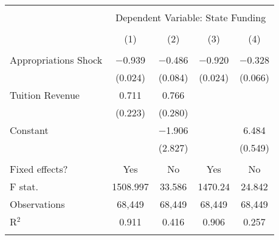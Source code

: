 
\begin{tabular}{@{\extracolsep{5pt}}lcccc} 
\\[-1.8ex]\hline 
\hline \\[-1.8ex] 
 & \multicolumn{4}{c}{Dependent Variable: State Funding} \\ 
\cline{2-5} 
\\[-1.8ex] & (1) & (2) & (3) & (4)\\ 
\hline \\[-1.8ex] 
 Appropriations Shock & $-$0.939 & $-$0.486 & $-$0.920 & $-$0.328 \\ 
  & (0.024) & (0.084) & (0.024) & (0.066) \\ 
  Tuition Revenue & 0.711 & 0.766 &  &  \\ 
  & (0.223) & (0.280) &  &  \\ 
  Constant &  & $-$1.906 &  & 6.484 \\ 
  &  & (2.827) &  & (0.549) \\ 
 \hline \\[-1.8ex] 
Fixed effects? & Yes & No & Yes & No \\ 
F stat. & 1508.997 & 33.586 & 1470.24 & 24.842 \\ 
Observations & 68,449 & 68,449 & 68,449 & 68,449 \\ 
R$^{2}$ & 0.911 & 0.416 & 0.906 & 0.257 \\ 
\hline 
\hline \\[-1.8ex] 
\end{tabular} 
